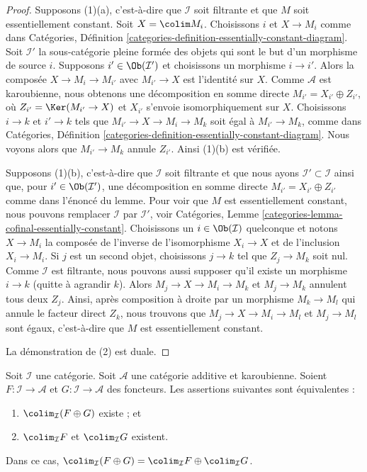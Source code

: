 \begin{proof}
Supposons (1)(a), c'est-à-dire que $\mathcal{I}$ soit filtrante et que $M$
soit essentiellement constant. Soit $X = \colim M_i$. Choisissons $i$ et
$X \to M_i$ comme dans
Catégories, Définition
\ref{categories-definition-essentially-constant-diagram}.
Soit $\mathcal{I}'$ la sous-catégorie pleine formée des objets qui sont le but
d'un morphisme de source $i$.
Supposons $i' \in \Ob(\mathcal{I}')$ et choisissons un morphisme $i \to i'$.
Alors la composée $X \to M_i \to M_{i'}$ avec $M_{i'} \to X$ est l'identité
sur $X$. Comme $\mathcal{A}$ est karoubienne, nous obtenons une décomposition
en somme directe $M_{i'} = X_{i'} \oplus Z_{i'}$, où
$Z_{i'} = \Ker(M_{i'} \to X)$ et $X_{i'}$ s'envoie isomorphiquement sur $X$.
Choisissons $i \to k$ et $i' \to k$ tels que
$M_{i'} \to X \to M_i \to M_k$
soit égal à $M_{i'} \to M_k$, comme dans Catégories, Définition
\ref{categories-definition-essentially-constant-diagram}.
Nous voyons alors que $M_{i'} \to M_k$ annule $Z_{i'}$.
Ainsi (1)(b) est vérifiée.

\medskip\noindent
Supposons (1)(b), c'est-à-dire que $\mathcal{I}$ soit filtrante et que nous
ayons $\mathcal{I}' \subset \mathcal{I}$ ainsi que, pour
$i' \in \Ob(\mathcal{I}')$, une décomposition en somme directe
$M_{i'} = X_{i'} \oplus Z_{i'}$
comme dans l'énoncé du lemme. Pour voir que $M$ est essentiellement constant,
nous pouvons remplacer $\mathcal{I}$ par $\mathcal{I}'$, voir
Catégories, Lemme \ref{categories-lemma-cofinal-essentially-constant}.
Choisissons un $i \in \Ob(\mathcal{I})$ quelconque
et notons $X \to M_i$ la composée de l'inverse de l'isomorphisme
$X_i \to X$ et de l'inclusion $X_i \to M_i$. Si $j$ est
un second objet, choisissons $j \to k$ tel que $Z_j \to M_k$ soit
nul. Comme $\mathcal{I}$ est filtrante, nous pouvons aussi supposer qu'il
existe un morphisme $i \to k$ (quitte à agrandir $k$). Alors
$M_j \to X \to M_i \to M_k$ et $M_j \to M_k$ annulent tous deux $Z_j$.
Ainsi, après composition à droite par un morphisme $M_k \to M_l$ qui annule
le facteur direct $Z_k$, nous trouvons que
$M_j \to X \to M_i \to M_l$ et
$M_j \to M_l$ sont égaux, c'est-à-dire que $M$ est essentiellement constant.

\medskip\noindent
La démonstration de (2) est duale.
\end{proof}

\begin{lemma}
\label{lemma-direct-sum-from-product-colimit}
Soit $\mathcal{I}$ une catégorie. Soit $\mathcal{A}$ une catégorie additive
et karoubienne. Soient $F : \mathcal{I} \to \mathcal{A}$ et
$G : \mathcal{I} \to \mathcal{A}$ des foncteurs. Les assertions suivantes
sont équivalentes :
\begin{enumerate}
\item $\colim_\mathcal{I}(F \oplus G)$ existe ; et
\item $\colim_\mathcal{I} F$ et $\colim_\mathcal{I} G$ existent.
\end{enumerate}
Dans ce cas, $\colim_\mathcal{I}(F \oplus G) =
\colim_\mathcal{I} F \oplus \colim_\mathcal{I} G$.
\end{lemma}

